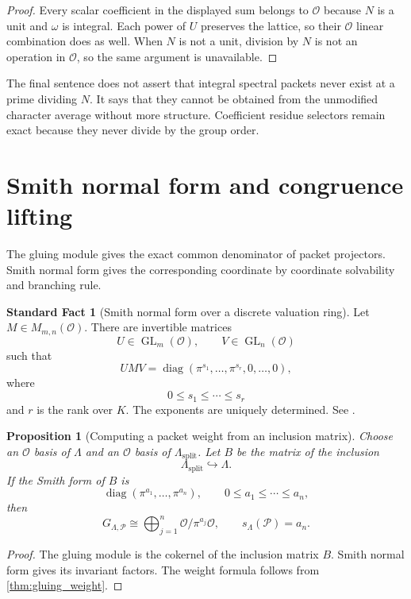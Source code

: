 \documentclass{aomart}
\newtheorem{proposition}[proposition]{Proposition}
\theoremstyle{definition}
\newtheorem{standardfact}[standardfact]{Standard Fact}
\theoremstyle{remark}
\newcommand{\OO}{\mathcal O}
\newcommand{\Pcal}{\mathcal P}
\newcommand{\diag}{\operatorname{diag}}
\begin{document}
\begin{proof}
Every scalar coefficient in the displayed sum belongs to $\OO$ because $N$ is a unit and $\omega$ is integral.  Each power of $U$ preserves the lattice, so their $\OO$ linear combination does as well.  When $N$ is not a unit, division by $N$ is not an operation in $\OO$, so the same argument is unavailable.
\end{proof}

The final sentence does not assert that integral spectral packets never exist at a prime dividing $N$.  It says that they cannot be obtained from the unmodified character average without more structure.  Coefficient residue selectors remain exact because they never divide by the group order.

\section{Smith normal form and congruence lifting}\label{sec:smith}

The gluing module gives the exact common denominator of packet projectors.  Smith normal form gives the corresponding coordinate by coordinate solvability and branching rule.

\begin{standardfact}[Smith normal form over a discrete valuation ring]\label{fact:smith}
Let $M\in M_{m,n}(\OO)$.  There are invertible matrices
\[
U\in\operatorname{GL}_m(\OO),
\qquad
V\in\operatorname{GL}_n(\OO)
\]
such that
\[
UMV
=
\diag(\pi^{s_1},\ldots,\pi^{s_r},0,\ldots,0),
\]
where
\[
0\leq s_1\leq\cdots\leq s_r
\]
and $r$ is the rank over $K$.  The exponents are uniquely determined.  See \cite{Newman1972}.
\end{standardfact}

\begin{proposition}[Computing a packet weight from an inclusion matrix]\label{prop:weight_from_inclusion}
Choose an $\OO$ basis of $\Lambda$ and an $\OO$ basis of $\Lambda_{\mathrm{split}}$.  Let $B$ be the matrix of the inclusion
\[
\Lambda_{\mathrm{split}}\hookrightarrow\Lambda.
\]
If the Smith form of $B$ is
\[
\diag(\pi^{a_1},\ldots,\pi^{a_n}),
\qquad
0\leq a_1\leq\cdots\leq a_n,
\]
then
\[
G_{\Lambda,\Pcal}
\cong
\bigoplus_{j=1}^n\OO/\pi^{a_j}\OO,
\qquad
s_\Lambda(\Pcal)=a_n.
\]
\end{proposition}

\begin{proof}
The gluing module is the cokernel of the inclusion matrix $B$.  Smith normal form gives its invariant factors.  The weight formula follows from \cref{thm:gluing_weight}.
\end{proof}
\end{document}
